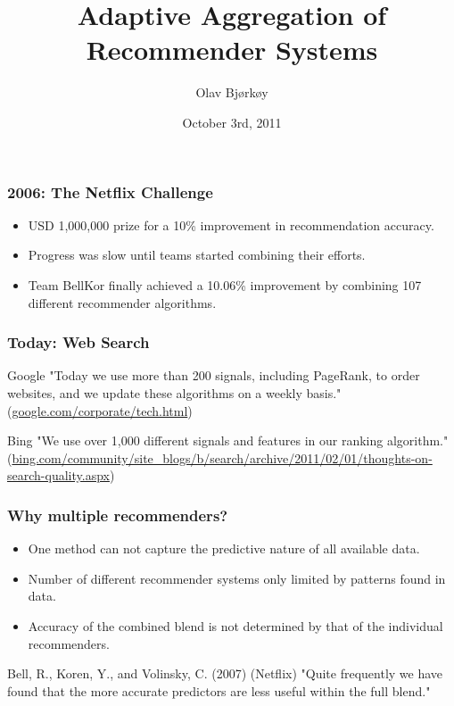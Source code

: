\documentclass[screen]{beamer}
\title[Adaptive Aggregation of Recommender Systems]%
{Adaptive Aggregation of\\Recommender Systems}
\author{Olav Bj{\o}rk{\o}y}
\institute[NTNU]{Department of Computer and Information Science}
\date{October 3rd, 2011}
\begin{document}
\ntnutitlepage


\begin{frame}
  \frametitle{2006: The Netflix Challenge}
    \begin{itemize}
      \item USD 1,000,000 prize for a 10\% improvement in recommendation accuracy.\\
      \item Progress was slow until teams started combining their efforts.\\
      \item Team BellKor finally achieved a 10.06\% improvement by combining 107 different recommender algorithms.
    \end{itemize}
\end{frame}

\begin{frame}
  \frametitle{Today: Web Search}
    \begin{block}{Google}
      "Today we use more than 200 signals, including PageRank, to order websites, and we update these algorithms on a weekly basis."
      (\url{google.com/corporate/tech.html})
    \end{block}
    \begin{block}{Bing}
      "We use over 1,000 different signals and features in our ranking algorithm."
      (\url{bing.com/community/site_blogs/b/search/archive/2011/02/01/thoughts-on-search-quality.aspx})
    \end{block}
\end{frame}

\begin{frame}
  \frametitle{Why multiple recommenders?}
  \begin{itemize}
    \item One method can not capture the predictive nature of all available data.
    \item Number of different recommender systems only limited by patterns found in data.
    \item Accuracy of the combined blend is not determined by that of the individual recommenders.
  \end{itemize}
  
  \begin{block}{Bell, R., Koren, Y., and Volinsky, C. (2007) (Netflix)}
    "Quite frequently we have found that the more accurate predictors are less useful within the full blend."
  \end{block}
\end{frame}
\end{document}
